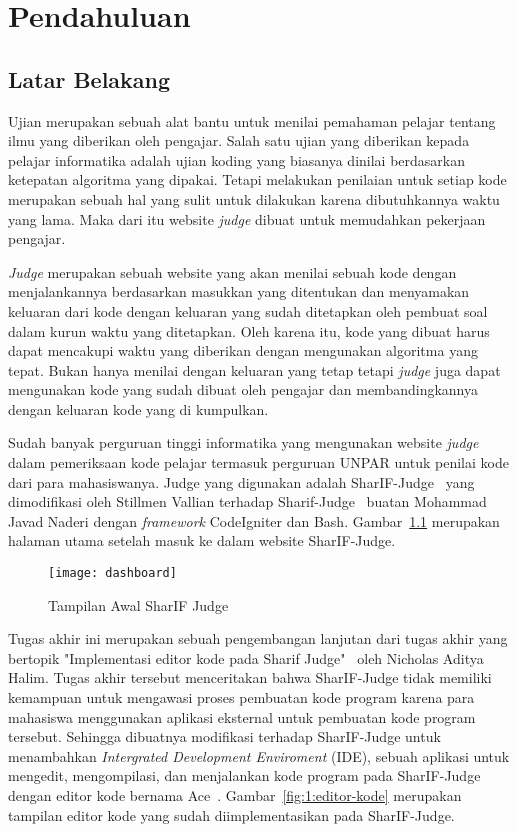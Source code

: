 \chapter{Pendahuluan}
\label{chap:intro}

\section{Latar Belakang}
\label{sec:1:latar_belakang}
Ujian merupakan sebuah alat bantu untuk menilai pemahaman pelajar tentang ilmu yang diberikan oleh pengajar. Salah satu ujian yang diberikan kepada pelajar informatika adalah ujian koding yang biasanya dinilai berdasarkan ketepatan algoritma yang dipakai. Tetapi melakukan penilaian untuk setiap kode merupakan sebuah hal yang sulit untuk dilakukan karena dibutuhkannya waktu yang lama. Maka dari itu website \textit{judge} dibuat untuk memudahkan pekerjaan pengajar.

\textit{Judge} merupakan sebuah website yang akan menilai sebuah kode dengan menjalankannya berdasarkan masukkan yang ditentukan dan menyamakan keluaran dari kode dengan keluaran yang sudah ditetapkan oleh pembuat soal dalam kurun waktu yang ditetapkan. Oleh karena itu, kode yang dibuat harus dapat mencakupi waktu yang diberikan dengan mengunakan algoritma yang tepat. Bukan hanya menilai dengan keluaran yang tetap tetapi \textit{judge} juga dapat mengunakan kode yang sudah dibuat oleh pengajar dan membandingkannya dengan keluaran kode yang di kumpulkan.

Sudah banyak perguruan tinggi informatika yang mengunakan website \textit{judge} dalam pemeriksaan kode pelajar termasuk perguruan UNPAR untuk penilai kode dari para mahasiswanya. Judge yang digunakan adalah SharIF-Judge~\cite{sharif} yang dimodifikasi oleh Stillmen Vallian terhadap Sharif-Judge~\cite{stillmen:sharif} buatan Mohammad Javad Naderi dengan \textit{framework} CodeIgniter dan Bash. Gambar~\ref{fig:1:dashboardpng} merupakan halaman utama setelah masuk ke dalam website SharIF-Judge.

\begin{figure}[H]
    \centering
    \texttt{[image: dashboard]}
    \caption[Tampilan Awal SharIF Judge]{Tampilan Awal SharIF Judge}
    \label{fig:1:dashboardpng}
\end{figure}

Tugas akhir ini merupakan sebuah pengembangan lanjutan dari tugas akhir yang bertopik "Implementasi editor kode pada Sharif Judge"~\cite{nicholas:sharif} oleh Nicholas Aditya Halim. Tugas akhir tersebut menceritakan bahwa SharIF-Judge tidak memiliki kemampuan untuk mengawasi proses pembuatan kode program karena para mahasiswa menggunakan aplikasi eksternal untuk pembuatan kode program tersebut. Sehingga dibuatnya modifikasi terhadap SharIF-Judge untuk menambahkan \textit{Intergrated Development Enviroment} (IDE), sebuah aplikasi untuk mengedit, mengompilasi, dan menjalankan kode program pada SharIF-Judge dengan editor kode bernama Ace~\cite{ace}. Gambar~\ref{fig:1:editor-kode} merupakan tampilan editor kode yang sudah diimplementasikan pada SharIF-Judge.

